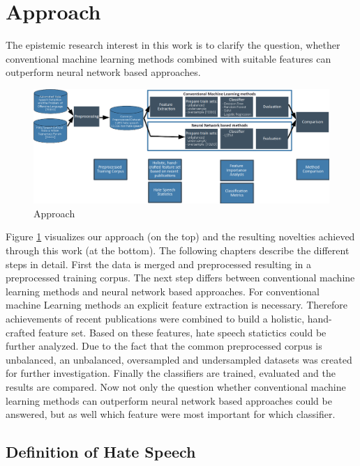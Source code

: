 \section{Approach} 
\label{approach}

The epistemic research interest in this work is to clarify the question, whether conventional machine learning methods combined with suitable features can outperform neural network based approaches.

\begin{figure}[ht]
	\centering
	\includegraphics[width=1.0\linewidth]{figures/pipeline.png}
	\caption{Approach}
	\label{fig:overall_pipeline}
\end{figure}

Figure \ref{fig:overall_pipeline} visualizes our approach (on the top) and the resulting novelties achieved through this work (at the bottom). The following chapters describe the different steps in detail. First the data is merged and preprocessed resulting in a preprocessed training corpus. The next step differs between conventional machine learning methods and neural network based approaches. For conventional machine Learning methods an explicit feature extraction is necessary. Therefore achievements of recent publications were combined to build a holistic, hand-crafted feature set. Based on these features, hate speech statictics could be further analyzed. Due to the fact that the common preprocessed corpus is unbalanced, an unbalanced, oversampled and undersampled datasets was created for further investigation. Finally the classifiers are trained, evaluated and the results are compared. Now not only the question whether conventional machine learning methods can outperform neural network based approaches could be answered, but as well which feature were most important for which classifier.

\subsection{Definition of Hate Speech} 
\label{ch:approachA}

